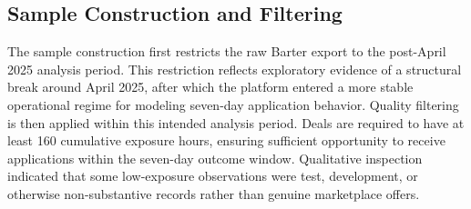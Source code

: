 \subsection{Sample Construction and Filtering}

The sample construction first restricts the raw Barter export to the post-April 2025 analysis period. This restriction reflects exploratory evidence of a structural break around April 2025, after which the platform entered a more stable operational regime for modeling seven-day application behavior. Quality filtering is then applied within this intended analysis period. Deals are required to have at least 160 cumulative exposure hours, ensuring sufficient opportunity to receive applications within the seven-day outcome window. Qualitative inspection indicated that some low-exposure observations were test, development, or otherwise non-substantive records rather than genuine marketplace offers.

